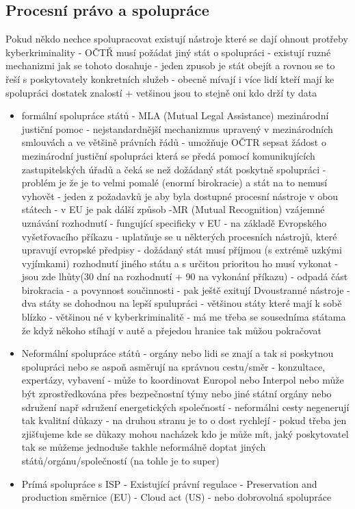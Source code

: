 \subsection{Procesní právo a spolupráce}
Pokud někdo nechce spolupracovat existují nástroje které se dají ohnout protřeby
kyberkriminality - OČTŘ musí požádat jiný stát o spolupráci - existují ruzné mechanizmi jak se
tohoto dosahuje - jeden zpusob je stát obejít a rovnou se to řeší s poskytovately konkretních
služeb - obecně mívají i více lidí kteří mají ke spolupráci dostatek znalostí + vetšinou jsou to stejně
oni kdo drží ty data 
\begin{itemize}
    \item formální spolupráce států - MLA (Mutual Legal Assistance) mezinárodní justiční pomoc -
nejstandardnější mechanizmus upravený v mezinárodních smlouvách a ve většině právních
řádů - umožňuje OČTR sepsat žádost o mezinárodní justiční spolupráci která se předá
pomocí komunikujících zastupitelských úřadů a čeká se než dožádaný stát poskytně
spolupráci - problém je že je to velmi pomalé (enormí birokracie) a stát na to nemusí vyhovět
- jeden z požadavků je aby byla dostupné procesní nástroje v obou státech - v EU je pak dálší
způsob -MR (Mutual Recognition) vzájemné uznávání rozhodnutí - fungující specificky v
EU - na základě Evropského vyšetřovacího příkazu - uplatňuje se u některých procesních
nástrojů, které upravují evropské předpisy - dožádaný stát musí příjmou (s extrémě uzkými
vyjímkami) rozhodnutí jiného státu a s určitou prioritou ho musí vykonat - jsou zde lhůty(30
dní na rozhodnutí + 90 na vykonání příkazu) - odpadá část birokracia - a povynnost
součinnosti - pak ještě exitují Dvoustranné nástroje - dva státy se dohodnou na lepší
spulupráci - většinou státy které mají k sobě blízko - většinou né v kyberkriminalitě - má me
třeba se sousedníma státama že když někoho stíhají v autě a přejedou hranice tak můžou
pokračovat
    \item Neformální spolupráce států - orgány nebo lidi se znají a tak si poskytnou spolupráci nebo se
aspoň asměrují na správnou cestu/směr - konzultace, expertázy, vybavení - může to
koordinovat Europol nebo Interpol nebo může být zprostředkována přes bezpečnostní týmy
nebo jiné státní orgány nebo sdružení např sdružení energetických společností - neformálni
cesty negenerují tak kvalitní důkazy - na druhou stranu je to o dost rychlejí - pokud třeba jen
zjišťujeme kde se důkazy mohou nacházek kdo je může mít, jaký poskytovatel tak se můžeme
jednoduše takhle neformálně doptat jiných států/orgánu/společností (na tohle je to super)
    \item Prímá spolupráce s ISP - Existující právní regulace - Preservation and production směrnice
(EU) - Cloud act (US) - nebo dobrovolná spolupráce
\end{itemize}
